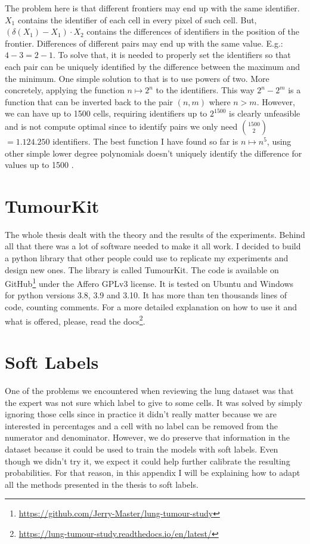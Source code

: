 The problem here is that different frontiers may end up with the same identifier. $X_1$ contains the identifier of each cell in every pixel of such cell. But, $(\delta (X_1) - X_1)  \cdot X_2$ contains the differences of identifiers in the position of the frontier. Differences of different pairs may end up with the same value. E.g.: $4-3 = 2-1$. To solve that, it is needed to properly set the identifiers so that each pair can be uniquely identified by the difference between the maximum and the minimum. One simple solution to that is to use powers of two. More concretely, applying the function $n \mapsto 2^n$ to the identifiers. This way $2^n-2^m$ is a function that can be inverted back to the pair $(n,m)$ where $n>m$. However, we can have up to 1500 cells, requiring identifiers up to $2^{1500}$ is clearly unfeasible and is not compute optimal since to identify pairs we only need $1500 \choose 2$ $=1.124.250$ identifiers. The best function I have found so far is $n \mapsto n^5$, using other simple lower degree polynomials doesn't uniquely identify the difference for values up to 1500 \cite{4567383}.

\chapter{TumourKit}

The whole thesis dealt with the theory and the results of the experiments. Behind all that there was a lot of software needed to make it all work. I decided to build a python library that other people could use to replicate my experiments and design new ones. The library is called TumourKit. The code is available on GitHub\footnote{\url{https://github.com/Jerry-Master/lung-tumour-study}} under the Affero GPLv3 license. It is tested on Ubuntu and Windows for python versions 3.8, 3.9 and 3.10. It has more than ten thousands lines of code, counting comments. For a more detailed explanation on how to use it and what is offered, please, read the docs\footnote{\url{https://lung-tumour-study.readthedocs.io/en/latest/}}.

\chapter{Soft Labels}

One of the problems we encountered when reviewing the lung dataset was that the expert was not sure which label to give to some cells. It was solved by simply ignoring those cells since in practice it didn't really matter because we are interested in percentages and a cell with no label can be removed from the numerator and denominator. However, we do preserve that information in the dataset because it could be used to train the models with soft labels. Even though we didn't try it, we expect it could help further calibrate the resulting probabilities. For that reason, in this appendix I will be explaining how to adapt all the methods presented in the thesis to soft labels. 

